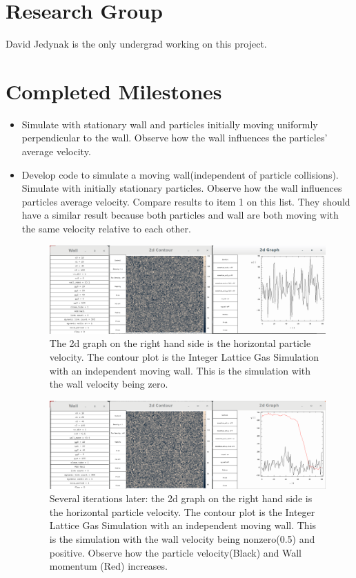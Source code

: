 \documentclass{article}
\begin{document}
\section{Research Group}
David Jedynak is the only undergrad working on this project.
\section{Completed Milestones}
\begin{itemize}
  \item Simulate with stationary wall and particles initially moving uniformly perpendicular to the wall. Observe how the wall influences the particles' average velocity.
 
    
  \item Develop code to simulate a moving wall(independent of particle collisions). Simulate with initially stationary particles. Observe how the wall influences particles average velocity. Compare results to item 1 on this list. They should have a similar result because both particles and wall are both moving with the same velocity relative to each other.
\begin{figure}

\includegraphics[scale=0.2]{ms1p0.png}
\caption{\label{fig} The 2d graph on the right hand side is the horizontal particle velocity. The contour plot is the Integer Lattice Gas Simulation with an independent moving wall. This is the simulation with the wall velocity being zero.}
\end{figure} 

\begin{figure}

\includegraphics[scale=0.2]{ms1p1.png}
\caption{\label{fig} Several iterations later: the 2d graph on the right hand side is the horizontal particle velocity. The contour plot is the Integer Lattice Gas Simulation with an independent moving wall. This is the simulation with the wall velocity being nonzero(0.5) and positive. Observe how the particle velocity(Black) and Wall momentum (Red) increases.}
\end{figure}


\end{itemize}
\end{document}
